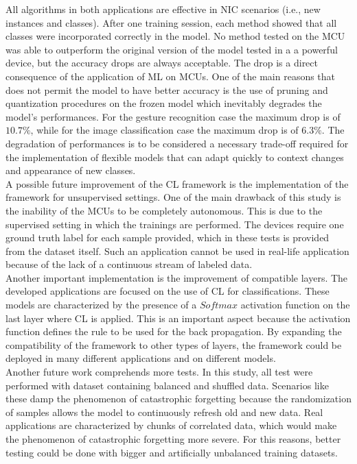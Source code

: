 \documentclass[12pt]{report}
\begin{document}
All algorithms in both applications are effective in NIC scenarios (i.e., new instances and classes). After one training session, each method showed that all classes were incorporated correctly in the model. No method tested on the MCU was able to outperform the original version of the model tested in a a powerful device, but the accuracy drops are always acceptable. The drop is a direct consequence of the application of ML on MCUs. One of the main reasons that does not permit the model to have better accuracy is the use of pruning and quantization procedures on the frozen model which inevitably degrades the model's performances. For the gesture recognition case the maximum drop is of $10.7 \%$, while for the image classification case the maximum drop is of $6.3 \%$. The degradation of performances is to be considered a necessary trade-off required for the implementation of flexible models that can adapt quickly to context changes and appearance of new classes.\\

A possible future improvement of the CL framework is the implementation of the framework for unsupervised settings. One of the main drawback of this study is the inability of the MCUs to be completely autonomous. This is due to the supervised setting in which the trainings are performed. The devices require one ground truth label for each sample provided, which in these tests is provided from the dataset itself. Such an application cannot be used in real-life application because of the lack of a continuous stream of labeled data.\\
Another important implementation is the improvement of compatible layers. The developed applications are focused on the use of CL for classifications. These models are characterized by the presence of a $Softmax$ activation function on the last layer where CL is applied. This is an important aspect because the activation function defines the rule to be used for the back propagation. By expanding the compatibility of the framework to other types of layers, the framework could be deployed in many different applications and on different models.\\
Another future work comprehends more tests. In this study, all test were performed with dataset containing balanced and shuffled data. Scenarios like these damp the phenomenon of catastrophic forgetting because the randomization of samples allows the model to continuously refresh old and new data. Real applications are characterized by chunks of correlated data, which would make the phenomenon of catastrophic forgetting more severe. For this reasons, better testing could be done with bigger and artificially unbalanced training datasets.



\printbibliography
\end{document}
